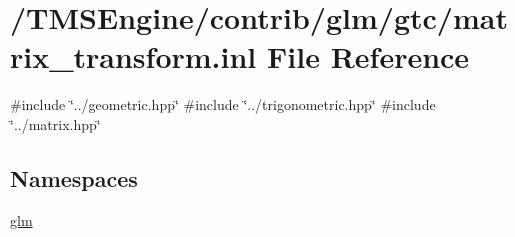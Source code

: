 \hypertarget{matrix__transform_8inl}{}\section{/\+T\+M\+S\+Engine/contrib/glm/gtc/matrix\+\_\+transform.inl File Reference}
\label{matrix__transform_8inl}
{\ttfamily \#include \char`\"{}../geometric.\+hpp\char`\"{}}\newline
{\ttfamily \#include \char`\"{}../trigonometric.\+hpp\char`\"{}}\newline
{\ttfamily \#include \char`\"{}../matrix.\+hpp\char`\"{}}\newline
\subsection*{Namespaces}
\begin{DoxyCompactItemize}
\item 
 \hyperlink{namespaceglm}{glm}
\end{DoxyCompactItemize}
